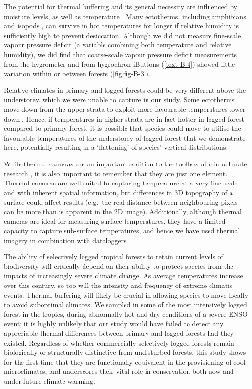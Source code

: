 \documentclass[12pt,a4paper,]{report}
\theoremstyle{definition}
\theoremstyle{definition}
\theoremstyle{definition}
\theoremstyle{remark}
\begin{document}
The potential for thermal buffering and its general necessity are
influenced by moisture levels, as well as temperature
\citep{mclaughlin_hydrologic_2017}. Many ectotherms, including
amphibians \citep{duellman_biology_1986} and isopods
\citep{hassall_predicting_2010}, can survive in hot temperatures for
longer if relative humidity is sufficiently high to prevent desiccation.
Although we did not measure fine-scale vapour pressure deficit (a
variable combining both temperature and relative humidity), we did find
that coarse-scale vapour pressure deficit measurements from the
hygrometer and from hygrochron iButtons (\autoref{text-B-4}) showed
little variation within or between forests (\autoref{fig:fig-B-3}).

Relative climates in primary and logged forests could be very different
above the understorey, which we were unable to capture in our study.
Some ectotherms move down from the upper strata to exploit more
favourable temperatures lower down \citep{scheffers_increasing_2013}.
Hence, if temperatures in higher strata are in fact hotter in logged
forest compared to primary forest, it is possible that species could
move to utilise the favourable temperatures of the understorey of logged
forest that we demonstrate here, potentially resulting in a `flattening'
of species' vertical distributions.

While thermal cameras are an important addition to the toolbox of
microclimate research \citep{faye_toolbox_2016}, it is also important to
remember that they are just one element. Thermal cameras are well-suited
to capturing temperature at a very fine-scale and with inherent spatial
information, but differences in 3D topography of a surface could affect
results (e.g.~the real distance between neighbouring pixels can be more
than is apparent in the 2D image). Additionally, although thermal
cameras are ideal for measuring surface temperatures, they have a
limited capacity to capture sub-surface temperatures, and hence we have
used thermal imagery in combination with dataloggers.

The ability of selectively logged tropical forests to retain current
levels of biodiversity will critically depend on their ability to
protect species from the impacts of increasingly severe climate change.
As average temperatures increase over this century, so too will the
intensity and frequency of extreme climatic events. Thermal buffering
will likely be crucial in allowing species to move locally to avoid
suboptimal climates. We sampled in some of the most intensively logged
forest in the tropics, during abnormally hot and dry conditions of a
severe ENSO event; it is highly unlikely that our study would have
failed to detect any appreciable thermal differences between primary and
logged forests had they existed. Regardless of whether commercially
selectively logged forests remain biologically or structurally
distinctive from undisturbed forests, this study shows for the first
time that they are functionally equivalent in the provisioning of cool
microclimates, and underscores their vital role in conservation both now
and under future climate warming.
\end{document}
